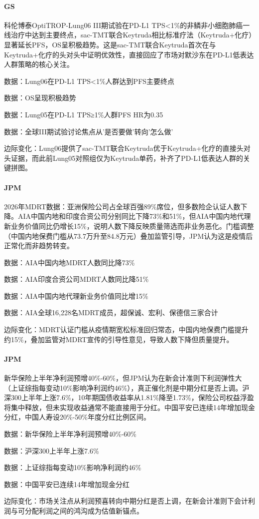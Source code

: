 \documentclass[11pt]{ctexart}
\begin{document}
\paragraph{GS} 科伦博泰OptiTROP-Lung06 III期试验在PD-L1 TPS<1\%的非鳞非小细胞肺癌一线治疗中达到主要终点，sac-TMT联合Keytruda相比标准疗法（Keytruda+化疗）显著延长PFS，OS呈积极趋势。这是sac-TMT联合Keytruda首次在与Keytruda+化疗的头对头中证明优效性，直接回应了市场对默沙东在PD-L1低表达人群策略的核心关注。
{\small\color{refgray}数据：Lung06在PD-L1 TPS<1\%人群达到PFS主要终点\par}
{\small\color{refgray}数据：OS呈现积极趋势\par}
{\small\color{refgray}数据：Lung05在PD-L1 TPS≥1\%人群PFS HR为0.35\par}
{\small\color{refgray}数据：全球III期试验讨论焦点从'是否要做'转向'怎么做'\par}
{\small\color{refgray}边际变化：Lung06提供了sac-TMT联合Keytruda优于Keytruda+化疗的直接头对头证据，而此前Lung05对照组仅为Keytruda单药，补齐了PD-L1低表达人群的关键拼图。\par}
\paragraph{JPM} 2026年MDRT数据：亚洲保险公司占全球百强89\%席位，但多数险企认证人数下降。AIA中国内地和印度合资公司分别同比下降73\%和51\%，但AIA中国内地代理新业务价值同比仍增长15\%，说明人数下降反映质量筛选而非业务恶化。门槛调整（中国内地保费门槛从73.7万升至84.8万元）叠加监管引导，JPM认为这是疫情后正常化而非趋势转变。
{\small\color{refgray}数据：AIA中国内地MDRT人数同比降73\%\par}
{\small\color{refgray}数据：AIA印度合资公司MDRT人数同比降51\%\par}
{\small\color{refgray}数据：AIA中国内地代理新业务价值同比增15\%\par}
{\small\color{refgray}数据：AIA全球16,228名MDRT成员，超保诚、宏利、保德信三家合计\par}
{\small\color{refgray}边际变化：MDRT认证门槛从疫情期宽松标准回归常态，中国内地保费门槛提升约15\%，叠加监管对MDRT宣传的引导性意见，导致人数下降但质量提升。\par}
\paragraph{JPM} 新华保险上半年净利润预增40\%-60\%，但JPM认为在新会计准则下利润弹性大（上证综指每变动10\%影响净利润约46\%），真正催化剂是中期分红是否上调。沪深300上半年上涨7.6\%，10年期国债收益率从1.81\%降至1.73\%，保险公司权益浮盈将集中释放，但未实现收益通常不能直接用于分红。中国平安已连续14年增加现金分红，中国人寿设20\%-50\%年度分红比例区间。
{\small\color{refgray}数据：新华保险上半年净利润预增40\%-60\%\par}
{\small\color{refgray}数据：沪深300上半年上涨7.6\%\par}
{\small\color{refgray}数据：上证综指每变动10\%影响净利润约46\%\par}
{\small\color{refgray}数据：中国平安已连续14年增加现金分红\par}
{\small\color{refgray}边际变化：市场关注点从利润预喜转向中期分红是否上调，在新会计准则下会计利润与可分配利润之间的鸿沟成为估值新锚点。\par}
\end{document}
